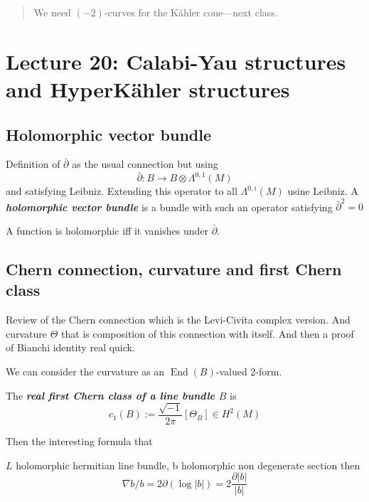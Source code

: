 {\color{3}\begin{quotation}
	We need $(-2)$-curves for the Kähler cone---next class.
\end{quotation}}

\section{Lecture 20: Calabi-Yau structures and HyperKähler structures}

\subsection{Holomorphic vector bundle}


\begin{defn}\leavevmode
	Definition of $\bar\partial$ as the usual connection but using
	\[\bar\partial:B\to B \otimes \Lambda^{0,1}(M)\]
and satisfying Leibniz. Extending this operator to all $\Lambda^{0,i}(M)$ usine Leibniz. A \textit{\textbf{holomorphic vector bundle}} is a bundle with such an operator satisfying $\bar\partial^2=0$	
\end{defn}

\begin{exercise}\leavevmode
A function is holomorphic iff it vanishes under $\bar\partial$.
\end{exercise}

\subsection{Chern connection, curvature and first Chern class}

Review of the Chern connection which is the Levi-Civita complex version. And curvature $\Theta$ that is composition of this connection with itself. And then a proof of Bianchi identity real quick.

\begin{remark}\leavevmode
	We can consider the curvature as an $\operatorname{End}(B)$-valued 2-form.
\end{remark}

\begin{defn}\leavevmode
	The \textit{\textbf{real first Chern class of a line bundle $B$}} is
	\[c_1(B):=\frac{\sqrt{-1}}{2\pi}[\Theta_B]\in H^{2}(M)\]
	
\end{defn}

Then the interesting formula that
\begin{claim}\leavevmode
	$L$ holomorphic hermitian line bundle, b holomorphic non degenerate section then
	\[\nabla b/b=2\partial (\operatorname{log}|b|)=2\frac{\partial|b|}{|b|}\]
\end{claim}

